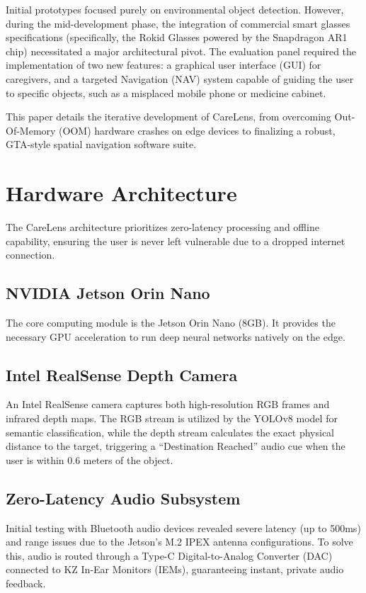 \documentclass[conference]{IEEEtran}
\begin{document}
Initial prototypes focused purely on environmental object detection. However, during the mid-development phase, the integration of commercial smart glasses specifications (specifically, the Rokid Glasses powered by the Snapdragon AR1 chip) necessitated a major architectural pivot. The evaluation panel required the implementation of two new features: a graphical user interface (GUI) for caregivers, and a targeted Navigation (NAV) system capable of guiding the user to specific objects, such as a misplaced mobile phone or medicine cabinet.

This paper details the iterative development of CareLens, from overcoming Out-Of-Memory (OOM) hardware crashes on edge devices to finalizing a robust, GTA-style spatial navigation software suite.

\section{Hardware Architecture}
The CareLens architecture prioritizes zero-latency processing and offline capability, ensuring the user is never left vulnerable due to a dropped internet connection.

\subsection{NVIDIA Jetson Orin Nano}
The core computing module is the Jetson Orin Nano (8GB). It provides the necessary GPU acceleration to run deep neural networks natively on the edge.

\subsection{Intel RealSense Depth Camera}
An Intel RealSense camera captures both high-resolution RGB frames and infrared depth maps. The RGB stream is utilized by the YOLOv8 model for semantic classification, while the depth stream calculates the exact physical distance to the target, triggering a ``Destination Reached'' audio cue when the user is within 0.6 meters of the object.

\subsection{Zero-Latency Audio Subsystem}
Initial testing with Bluetooth audio devices revealed severe latency (up to 500ms) and range issues due to the Jetson's M.2 IPEX antenna configurations. To solve this, audio is routed through a Type-C Digital-to-Analog Converter (DAC) connected to KZ In-Ear Monitors (IEMs), guaranteeing instant, private audio feedback.
\end{document}
